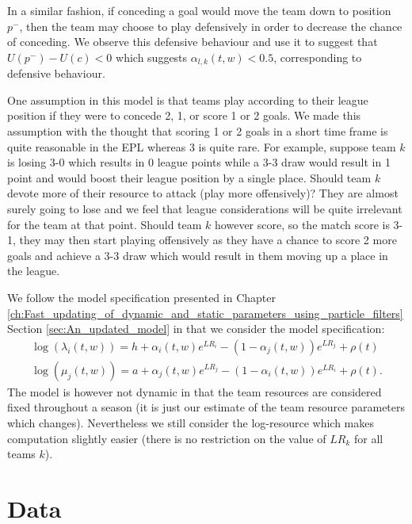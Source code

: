 In a similar fashion, if conceding a goal would move the team down to position \(p^{-}\), then the team may choose to
play defensively in order to decrease the chance of conceding. We observe this defensive behaviour and use it to suggest
that \(U(p^{-}) - U(c) < 0\) which suggests \(\alpha_{l, k}(t, w) < 0.5\), corresponding to defensive behaviour.

One assumption in this model is that teams play according to their league position if they were to concede 2, 1, or
score 1 or 2 goals. We made this assumption with the thought that scoring 1 or 2 goals in a short time frame is quite
reasonable in the \gls{EPL} whereas 3 is quite rare. For example, suppose team \(k\) is losing 3-0 which results in 0
league points while a 3-3 draw would result in 1 point and would boost their league position by a single place. Should
team \(k\) devote more of their resource to attack (play more offensively)? They are almost surely going to lose and we
feel that league considerations will be quite irrelevant for the team at that point. Should team \(k\) however score, so
the match score is 3-1, they may then start playing offensively as they have a chance to score 2 more goals and achieve
a 3-3 draw which would result in them moving up a place in the league.

We follow the model specification presented in Chapter
\ref{ch:Fast_updating_of_dynamic_and_static_parameters_using_particle_filters} Section \ref{sec:An_updated_model} in
that we consider the model specification:
\begin{align}
  \log(\lambda_{i}(t, w)) = h + \alpha_i(t, w) e^{LR_i} - (1 - \alpha_j(t, w)) e^{LR_j} + \rho(t)\\
  \log(\mu_{j}(t, w)) = a + \alpha_j(t, w) e^{LR_j} - (1 - \alpha_i(t, w)) e^{LR_i} + \rho(t).
\end{align} 
The model is however not dynamic in that the team resources are considered fixed throughout a season (it is just our
estimate of the team resource parameters which changes). Nevertheless we still consider the log-resource which makes
computation slightly easier (there is no restriction on the value of \(LR_k\) for all teams \(k\)).

\section{Data}
\label{sec:Data_utility}

